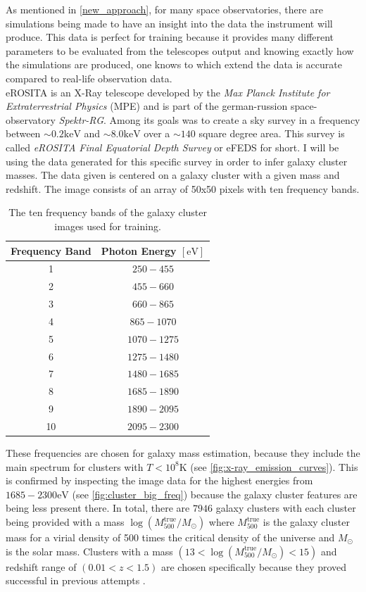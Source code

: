 As mentioned in \cref{new_approach}, for many space observatories, there are simulations being made to have an insight into the data the instrument will produce. This data is perfect for training because it provides many different parameters to be evaluated from the telescopes output and knowing exactly how the simulations are produced, one knows to which extend the data is accurate compared to real-life observation data. \\
eROSITA is an X-Ray telescope developed by the \textit{Max Planck Institute for Extraterrestrial Physics} (MPE) and is part of the german-russion space-observatory \textit{Spektr-RG}. Among its goals was to create a sky survey in a frequency between $\sim 0.2\text{keV}$ and $\sim 8.0\text{keV}$ over a $\sim 140$ square degree area. This survey is called \textit{eROSITA Final Equatorial Depth Survey} or eFEDS for short. I will be using the data generated for this specific survey in order to infer galaxy cluster masses. The data given is centered on a galaxy cluster with a given mass and redshift. The image consists of an array of 50x50 pixels with ten frequency bands.

\begin{table}[h]
\centering
\begin{tabular}{@{}cc@{}}\toprule
Frequency Band & Photon Energy $[\text{eV}]$ \\
\midrule
1 & $250-455$ \\
2 & $455-660$ \\
3 & $660-865$ \\
4 & $865-1070$ \\
5 & $1070-1275$ \\
6 & $1275-1480$ \\
7 & $1480-1685$ \\
8 & $1685-1890$ \\
9 & $1890-2095$ \\
10 & $2095-2300$ \\
\bottomrule
\end{tabular}
\caption{The ten frequency bands of the galaxy cluster images used for training.}
\label{tab:freq_bands}
\end{table}





These frequencies are chosen for galaxy mass estimation, because they include the main spectrum for clusters with $T<10^8\text{K}$ (see \autoref{fig:x-ray_emission_curves}). This is confirmed by inspecting the image data for the highest energies from $1685 - 2300 \text{eV}$ (see \autoref{fig:cluster_big_freq}) because the galaxy cluster features are being less present there. In total, there are $7946$ galaxy clusters with each cluster being provided with a mass $\log{(M_{500}^{\text{true}}/M_{\odot})}$ where $M_{500}^{\text{true}}$ is the galaxy cluster mass for a virial density of 500 times the critical density of the universe and $M_{\odot}$ is the solar mass. Clusters with a mass $(13 < \log{(M_{500}^{\text{true}}/M_{\odot})} < 15)$ and redshift range of $(0.01 < z < 1.5)$ are chosen specifically because they proved successful in previous attempts \citep{Ntampaka_2018}.

